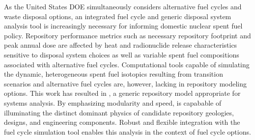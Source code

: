 As the United States \gls{DOE} simultaneously considers alternative fuel cycles 
and waste disposal options, an integrated fuel cycle and generic disposal system 
analysis tool is increasingly necessary for informing domestic nuclear spent 
fuel policy.  Repository performance metrics such as necessary repository 
footprint and peak annual dose are affected by heat and radionuclide release 
characteristics sensitive to disposal system choices as well as variable spent 
fuel compositions associated  with alternative fuel cycles.  Computational 
tools capable of simulating the dynamic, heterogeneous spent fuel isotopics 
resulting from transition scenarios and alternative fuel cycles are, however, 
lacking in repository modeling  options.  This work has resulted in \Cyder, a 
generic repository model appropriate for systems analysis.  By emphasizing 
modularity and speed, \Cyder is capabable of illuminating the distinct dominant 
physics of candidate repository geologies, designs, and engineering components. 
Robust and flexible integration with the \Cyclus fuel cycle simulation tool 
enables this analysis in the context of fuel cycle options.  

\glsresetall
